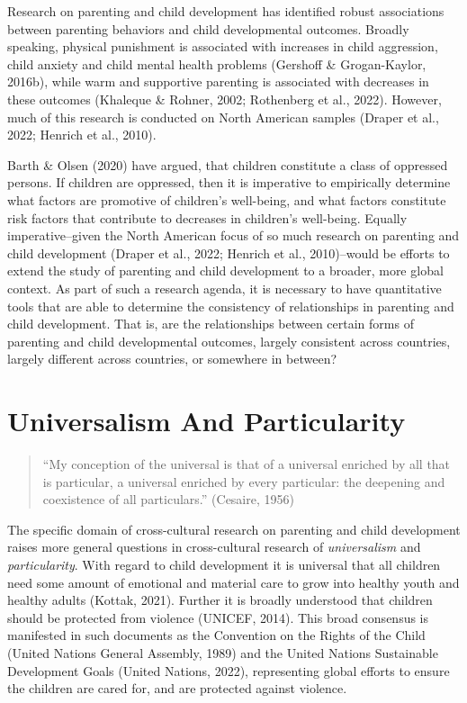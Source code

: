 \documentclass[
  letterpaper,
  DIV=11,
  numbers=noendperiod]{scrreprt}
\begin{document}
Research on parenting and child development has identified robust
associations between parenting behaviors and child developmental
outcomes. Broadly speaking, physical punishment is associated with
increases in child aggression, child anxiety and child mental health
problems (Gershoff \& Grogan-Kaylor, 2016b), while warm and supportive
parenting is associated with decreases in these outcomes (Khaleque \&
Rohner, 2002; Rothenberg et al., 2022). However, much of this research
is conducted on North American samples (Draper et al., 2022; Henrich et
al., 2010).

Barth \& Olsen (2020) have argued, that children constitute a class of
oppressed persons. If children are oppressed, then it is imperative to
empirically determine what factors are promotive of children's
well-being, and what factors constitute risk factors that contribute to
decreases in children's well-being. Equally imperative--given the North
American focus of so much research on parenting and child development
(Draper et al., 2022; Henrich et al., 2010)--would be efforts to extend
the study of parenting and child development to a broader, more global
context. As part of such a research agenda, it is necessary to have
quantitative tools that are able to determine the consistency of
relationships in parenting and child development. That is, are the
relationships between certain forms of parenting and child developmental
outcomes, largely consistent across countries, largely different across
countries, or somewhere in between?

\section{Universalism And
Particularity}\label{universalism-and-particularity}

\begin{quote}
``My conception of the universal is that of a universal enriched by all
that is particular, a universal enriched by every particular: the
deepening and coexistence of all particulars.'' (Cesaire, 1956)
\end{quote}

The specific domain of cross-cultural research on parenting and child
development raises more general questions in cross-cultural research of
\emph{universalism} and \emph{particularity}.  With
regard to child development it is universal that all children need some
amount of emotional and material care to grow into healthy youth and
healthy adults (Kottak, 2021). Further it is broadly understood that
children should be protected from violence (UNICEF, 2014). This broad
consensus is manifested in such documents as the Convention on the
Rights of the Child (United Nations General Assembly, 1989) and the
United Nations Sustainable Development Goals (United Nations, 2022),
representing global efforts to ensure the children are cared for, and
are protected against violence.
\end{document}
